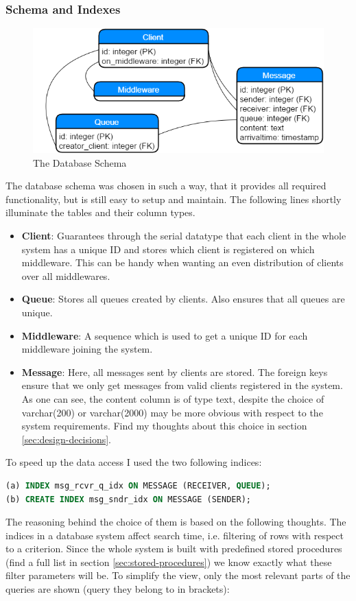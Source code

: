 \documentclass[11pt]{article}
\begin{document}
\subsubsection{Schema and Indexes}\label{sec:schema-and-indexes}
\begin{figure}[!ht]
\centering
\includegraphics[width=0.7\linewidth]{figures/database/db_schema}
\caption{The Database Schema}
\label{fig:db_schema}
\end{figure}
The database schema was chosen in such a way, that it provides all required functionality, but is still easy to setup and maintain. The following lines shortly illuminate the tables and their column types.
\begin{itemize}
	\item \textbf{Client}: Guarantees through the serial datatype that each client in the whole system has a unique ID and stores which client is registered on which middleware. This can be handy when wanting an even distribution of clients over all middlewares.
	\item \textbf{Queue}: Stores all queues created by clients. Also ensures that all queues are unique.
	\item \textbf{Middleware}: A sequence which is used to get a unique ID for each middleware joining the system.
	\item \textbf{Message}: Here, all messages sent by clients are stored. The foreign keys ensure that we only get messages from valid clients registered in the system. As one can see, the content column is of type text, despite the choice of varchar(200) or varchar(2000) may be more obvious with respect to the system requirements. Find my thoughts about this choice in section \ref{sec:design-decisions}.
\end{itemize}
To speed up the data access I used the two following indices:
\begin{lstlisting}[language=SQL,basicstyle=\small]
(a) INDEX msg_rcvr_q_idx ON MESSAGE (RECEIVER, QUEUE);
(b) CREATE INDEX msg_sndr_idx ON MESSAGE (SENDER);
\end{lstlisting}
The reasoning behind the choice of them is based on the following thoughts. The indices in a database system affect search time, i.e. filtering of rows with respect to a criterion. Since the whole system is built with predefined stored procedures (find a full list in section \ref{sec:stored-procedures}) we know exactly what these filter parameters will be. To simplify the view, only the most relevant parts of the queries are shown (query they belong to in brackets):
\end{document}
